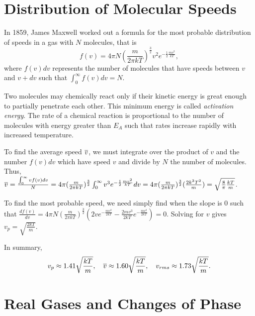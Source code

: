 \section{Distribution of Molecular Speeds}

\begin{definition}
    In 1859, James Maxwell worked out a formula for the most probable distribution of speeds in a gas with $N$ molecules, that is $$f(v) = 4\pi N(\frac{m}{2\pi kT})^{\frac{3}{2}}v^2e^{-\frac{1}{2}\frac{mv^2}{kT}},$$ where $f(v)dv$ represents the number of molecules that have speeds between $v$ and $v+dv$ such that $\int_0^\infty f(v)dv = N$.
\end{definition}
\begin{definition}
    Two molecules may chemically react only if their kinetic energy is great enough to partially penetrate each other. This minimum energy is called \emph{activation energy}. The rate of a chemical reaction is proportional to the number of molecules with energy greater than $E_A$ such that rates increase rapidly with increased temperature.
\end{definition}
\begin{example}
    To find the average speed $\overline{v}$, we must integrate over the product of $v$ and the number $f(v)dv$ which have speed $v$ and divide by $N$ the number of molecules. Thus, $\overline{v} = \frac{\int_0^\infty vf(v)dv}{N} = 4\pi(\frac{m}{2\pi k T})^\frac{3}{2} \int_0^\infty v^3 e^{-\frac{1}{2}\frac{mv^2}{kT}}dv = 4\pi(\frac{m}{2\pi k T})^\frac{3}{2} (\frac{2k^2 T^2}{m}) = \sqrt{\frac{8}{\pi}\frac{kT}{m}}$.

    To find the most probable speed, we need simply find when the slope is $0$ such that $\frac{df(v)}{dv} = 4\pi N(\frac{m}{2\pi k T})^\frac{3}{2}(2ve^{-\frac{mv^2}{2kT}} - \frac{2mv^3}{2kT}e^{-\frac{mv^2}{2kT}})=0$. Solving for $v$ gives $v_p = \sqrt{\frac{2kT}{m}}$.
\end{example}
\begin{note}
    In summary, $$v_p \approx 1.41 \sqrt{\frac{kT}{m}}, \quad \overline{v} \approx 1.60 \sqrt{\frac{kT}{m}}, \quad v_{rms} \approx 1.73 \sqrt{\frac{kT}{m}}.$$
\end{note}

\section{Real Gases and Changes of Phase}

\